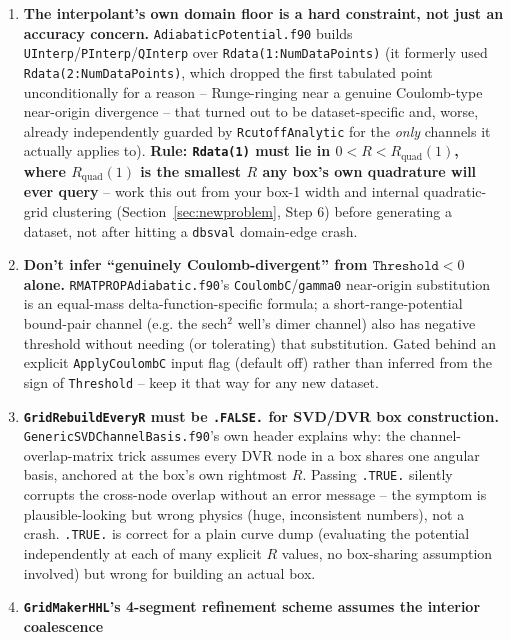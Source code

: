 \documentclass[11pt]{article}
\newcommand{\file}[1]{\texttt{#1}}
\newcommand{\sub}[1]{\texttt{#1}}
\begin{document}
\begin{enumerate}[leftmargin=*]
  then, verify by direct comparison against a no-interpolation reference before trusting results
  that depend on near-origin resolution.
\item \textbf{The interpolant's own domain floor is a hard constraint, not just an accuracy
  concern.} \file{AdiabaticPotential.f90} builds \texttt{UInterp}/\texttt{PInterp}/\texttt{QInterp}
  over \texttt{Rdata(1:NumDataPoints)} (it formerly used
  \texttt{Rdata(2:NumDataPoints)}, which dropped the first tabulated point unconditionally for a
  reason -- Runge-ringing near a genuine Coulomb-type near-origin divergence -- that turned out to
  be dataset-specific and, worse, already independently guarded by \texttt{RcutoffAnalytic} for the
  \emph{only} channels it actually applies to). \textbf{Rule: \texttt{Rdata(1)} must lie in
  $0<R<R_{\text{quad}}(1)$, where $R_{\text{quad}}(1)$ is the smallest $R$ any box's own
  quadrature will ever query} -- work this out from your box-1 width and internal quadratic-grid
  clustering (Section~\ref{sec:newproblem}, Step 6) before generating a dataset, not after hitting
  a \sub{dbsval} domain-edge crash.
\item \textbf{Don't infer ``genuinely Coulomb-divergent'' from $\texttt{Threshold}<0$ alone.}
  \file{RMATPROPAdiabatic.f90}'s \texttt{CoulombC}/\texttt{gamma0} near-origin substitution is an
  equal-mass delta-function-specific formula; a short-range-potential bound-pair channel (e.g. the
  sech$^2$ well's dimer channel) also has negative threshold without needing (or tolerating) that
  substitution. Gated behind an explicit \texttt{ApplyCoulombC} input flag (default off) rather
  than inferred from the sign of \texttt{Threshold} -- keep it that way for any new dataset.
\item \textbf{\texttt{GridRebuildEveryR} must be \texttt{.FALSE.} for SVD/DVR box construction.}
  \sub{GenericSVDChannelBasis.f90}'s own header explains why: the channel-overlap-matrix trick
  assumes every DVR node in a box shares one angular basis, anchored at the box's own rightmost
  $R$. Passing \texttt{.TRUE.} silently corrupts the cross-node overlap without an error message
  -- the symptom is plausible-looking but wrong physics (huge, inconsistent numbers), not a crash.
  \texttt{.TRUE.} is correct for a plain curve dump (evaluating the potential independently at
  each of many explicit $R$ values, no box-sharing assumption involved) but wrong for building an
  actual box.
\item \textbf{\sub{GridMakerHHL}'s 4-segment refinement scheme assumes the interior coalescence
}
\end{enumerate}
\end{document}
